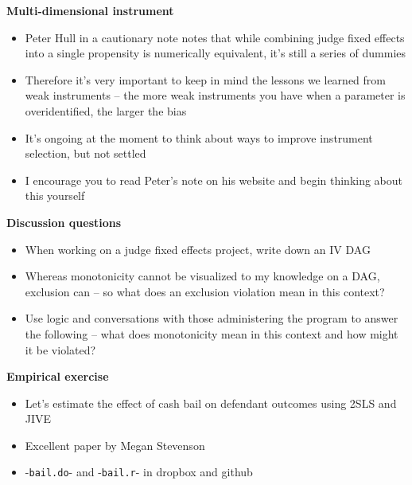 \documentclass[notes=show]{beamer}
\begin{document}
\begin{frame}[plain]
\begin{center}
\textbf{Multi-dimensional instrument}
\end{center}

\begin{itemize}
\item Peter Hull in a cautionary note notes that while combining judge fixed effects into a single propensity is numerically equivalent, it's still a series of dummies
\item Therefore it's very important to keep in mind the lessons we learned from weak instruments -- the more weak instruments you have when a parameter is overidentified, the larger the bias
\item It's ongoing at the moment to think about ways to improve instrument selection, but not settled
\item I encourage you to read Peter's note on his website and begin thinking about this yourself
\end{itemize}

\end{frame}


\begin{frame}[plain]
\begin{center}
\textbf{Discussion questions}
\end{center}

\begin{itemize}
\item When working on a judge fixed effects project, write down an IV DAG 
\item Whereas monotonicity cannot be visualized to my knowledge on a DAG, exclusion can -- so what does an exclusion violation mean in this context?
\item Use logic and conversations with those administering the program to answer the following -- what does monotonicity mean in this context and how might it be violated?  
\end{itemize}

\end{frame}


\begin{frame}[plain]
\begin{center}
\textbf{Empirical exercise}
\end{center}

\begin{itemize}

\item Let's estimate the effect of cash bail on defendant outcomes using 2SLS and JIVE
\item Excellent paper by Megan Stevenson
\item -\texttt{bail.do}- and -\texttt{bail.r}- in dropbox and github
\end{itemize}

\end{frame}
\end{document}
